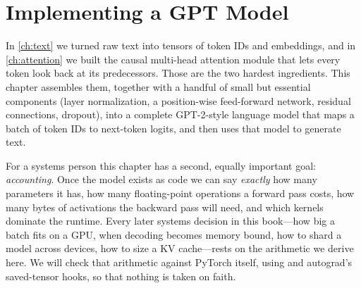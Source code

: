 \chapter{Implementing a GPT Model}\label{ch:gpt}

In \cref{ch:text} we turned raw text into tensors of token IDs and embeddings, and in
\cref{ch:attention} we built the causal multi-head attention module that lets every token
look back at its predecessors. Those are the two hardest ingredients. This chapter assembles
them, together with a handful of small but essential components (layer normalization, a
position-wise feed-forward network, residual connections, dropout), into a complete
GPT-2-style language model that maps a batch of token IDs to next-token logits, and then
uses that model to generate text.

For a systems person this chapter has a second, equally important goal: \emph{accounting}.
Once the model exists as code we can say \emph{exactly} how many parameters it has, how many
floating-point operations a forward pass costs, how many bytes of activations the backward pass
will need, and which kernels dominate the runtime. Every later systems decision in this
book---how big a batch fits on a GPU, when decoding becomes memory bound, how to shard a model
across devices, how to size a KV cache---rests on the arithmetic we derive here. We will check
that arithmetic against PyTorch itself, using  and autograd's
saved-tensor hooks, so that nothing is taken on faith.

